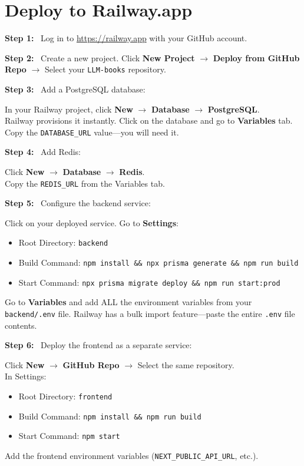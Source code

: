 \documentclass[12pt, letterpaper, oneside]{book}
\newcommand{\step}[1]{\noindent\textbf{\textcolor{primary}{Step #1:}}~}
\begin{document}
\section{Deploy to Railway.app}

\step{1} Log in to \url{https://railway.app} with your GitHub account.

\step{2} Create a new project. Click \textbf{New Project} $\rightarrow$ \textbf{Deploy from GitHub Repo} $\rightarrow$ Select your \texttt{LLM-books} repository.

\step{3} Add a PostgreSQL database:
\begin{actionbox}
In your Railway project, click \textbf{New} $\rightarrow$ \textbf{Database} $\rightarrow$ \textbf{PostgreSQL}.\\
Railway provisions it instantly. Click on the database and go to \textbf{Variables} tab. Copy the \texttt{DATABASE\_URL} value---you will need it.
\end{actionbox}

\step{4} Add Redis:
\begin{actionbox}
Click \textbf{New} $\rightarrow$ \textbf{Database} $\rightarrow$ \textbf{Redis}.\\
Copy the \texttt{REDIS\_URL} from the Variables tab.
\end{actionbox}

\step{5} Configure the backend service:
\begin{actionbox}
Click on your deployed service. Go to \textbf{Settings}:
\begin{itemize}[leftmargin=1.5em]
  \item Root Directory: \texttt{backend}
  \item Build Command: \texttt{npm install \&\& npx prisma generate \&\& npm run build}
  \item Start Command: \texttt{npx prisma migrate deploy \&\& npm run start:prod}
\end{itemize}
Go to \textbf{Variables} and add ALL the environment variables from your \texttt{backend/.env} file. Railway has a bulk import feature---paste the entire \texttt{.env} file contents.
\end{actionbox}

\step{6} Deploy the frontend as a separate service:
\begin{actionbox}
Click \textbf{New} $\rightarrow$ \textbf{GitHub Repo} $\rightarrow$ Select the same repository.\\
In Settings:
\begin{itemize}[leftmargin=1.5em]
  \item Root Directory: \texttt{frontend}
  \item Build Command: \texttt{npm install \&\& npm run build}
  \item Start Command: \texttt{npm start}
\end{itemize}
Add the frontend environment variables (\texttt{NEXT\_PUBLIC\_API\_URL}, etc.).
\end{actionbox}
\end{document}
